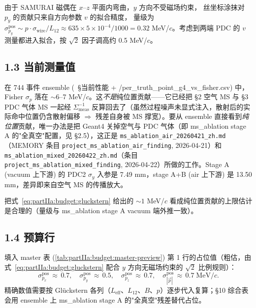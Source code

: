 由于 SAMURAI 磁偶在 $x$--$z$ 平面内弯曲，$y$ 方向不受磁场约束，
丝坐标涂抹对 $p_y$ 的贡献只来自方向参数 $v$ 的拟合精度，
量级为 $\sigma_{p_y}^\mathrm{pos}\sim p\cdot\sigma_\mathrm{wire}/L_{12} \approx 635\times 5\times 10^{-4}/1000 = 0.32$ MeV/$c$。考虑到两端 PDC 的 $v$ 测量都进入拟合，按 $\sqrt 2$ 因子调高约 0.5 MeV/$c$。

\subsection*{1.3 当前测量值}

在 744 事件 ensemble (\StatusReport{}~§当前性能 + \DeepDiveData{}/per\_truth\_point\_g4\_vs\_fisher.csv) 中，Fisher $\sigma_p$ 落在 $\sim 6$--7 MeV/$c$。这\emph{不是}纯位置贡献——它已经把 §2 空气 MS 与 §3 PDC 气体 MS 一起经 $\Sigma_\mathrm{meas}^{-1}$ 反算回去了（虽然过程噪声未显式注入，散射后的实际命中位置仍含散射偏移 $\Rightarrow$ 残差自身被 MS 撑宽）。要从 ensemble 直接看到\emph{纯位置}贡献，唯一办法是把 Geant4 关掉空气与 PDC 气体（即 ms\_ablation stage A 的"全真空"配置，见 §2.5），这正是 \texttt{ms\_ablation\_air\_20260421\_zh.md}（MEMORY 条目 \texttt{project\_ms\_ablation\_air\_finding}, 2026-04-21）和 \texttt{ms\_ablation\_mixed\_20260422\_zh.md}（条目 \texttt{project\_ms\_ablation\_mixed\_finding}, 2026-04-22）所做的工作。Stage A (vacuum 上下游) 的 PDC2 $\sigma_y$ 入参是 7.49 mm，stage A+B (air 上下游) 是 13.50 mm，差异即来自空气 MS 的传播放大。

把式~\eqref{eq:partIIa:budget:gluckstern} 给出的 $\sim 1$ MeV/$c$ 看成纯位置贡献的上限估计是合理的（量级与 ms\_ablation stage A vacuum 端外推一致）。

\subsection*{1.4 预算行}

填入 master 表 (\ref{tab:partIIa:budget:master-preview}) 第 1 行的占位值（粗估，由式~\eqref{eq:partIIa:budget:gluckstern} 配合 $y$ 方向无磁场约束的 $\sqrt 2$ 比例规则）：
\begin{equation}
  \sigma_{p_x}^\mathrm{pos}\,\approx\,0.7,\quad
  \sigma_{p_y}^\mathrm{pos}\,\approx\,0.5,\quad
  \sigma_{p_z}^\mathrm{pos}\,\approx\,0.7,\quad
  \sigma_{|\vec p|}^\mathrm{pos}\,\approx\,0.7\;\mathrm{MeV}/c.
  \label{eq:partIIa:budget:row1}
\end{equation}
精确数值需要按 Glückstern 各列（$L_\mathrm{eff}$、$L_{12}$、$B$、$p$）逐步代入复算；§10 综合表会用 ensemble 上 ms\_ablation stage A 的"全真空"残差替代占位。

